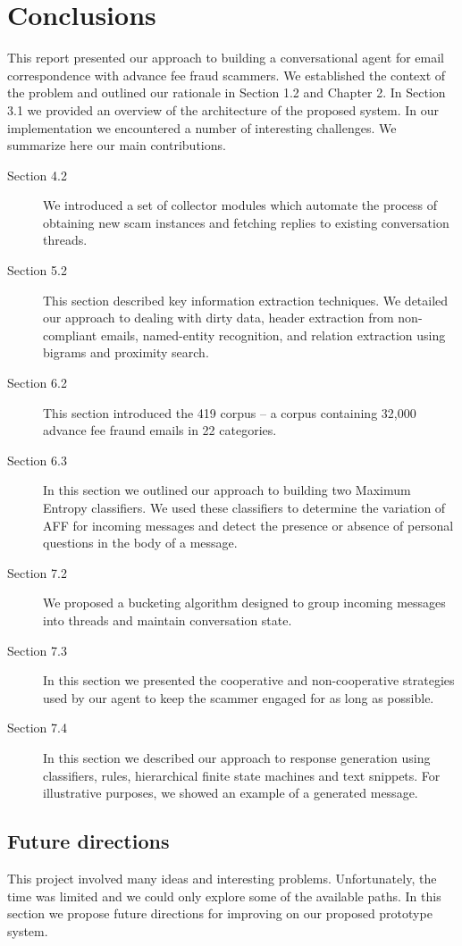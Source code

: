 \chapter{Conclusions}
This report presented our approach to building a conversational agent for email correspondence with advance fee fraud scammers.
We established the context of the problem and outlined our rationale in Section 1.2 and Chapter 2. In Section 3.1 we provided an
overview of the architecture of the proposed system. In our implementation we encountered a number of interesting challenges.
We summarize here our main contributions.
\begin{description}
\item[Section 4.2] We introduced a set of collector modules which automate the process of obtaining new scam instances and fetching replies to existing conversation threads.
\item[Section 5.2] This section described key information extraction techniques. We detailed our approach to dealing with dirty data, header extraction from non-compliant emails, named-entity recognition, and relation extraction using bigrams and proximity search.
\item[Section 6.2] This section introduced the 419 corpus -- a corpus containing 32,000 advance fee fraund emails in 22 categories.
\item[Section 6.3] In this section we outlined our approach to building two Maximum Entropy classifiers. We used these classifiers to determine the variation of AFF for incoming messages and detect the presence or absence of personal questions in the body of a message.
\item[Section 7.2] We proposed a bucketing algorithm designed to group incoming messages into threads and maintain conversation state.
\item[Section 7.3] In this section we presented the cooperative and non-cooperative strategies used by our agent to keep the scammer engaged for as long as possible.
\item[Section 7.4] In this section we described our approach to response generation using classifiers, rules, hierarchical finite state machines and text snippets. For illustrative purposes, we showed an example of a generated message.
\end{description}	

\section{Future directions}
This project involved many ideas and interesting problems. Unfortunately, the time was limited and we could only explore some of the available paths. In this section we propose future directions for improving on our proposed prototype system.

